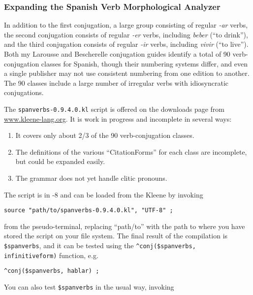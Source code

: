 \subsubsection{Expanding the Spanish Verb Morphological Analyzer}

In addition to the first conjugation, a large group consisting of regular
\mbox{\emph{-ar}} verbs, 
the second conjugation consists of regular \mbox{\emph{-er}} verbs, including \emph{beber} (``to drink''), and the third conjugation consists of
regular \mbox{\emph{-ir}} verbs, including \emph{vivir} (``to live'').  Both my Larousse and Bescherelle conjugation guides identify a total
of 90 verb-conjugation classes for Spanish, though their numbering systems differ, and even a
single publisher may not use consistent numbering from one edition to another.  The 90 classes
include a large number of irregular verbs with idiosyncratic conjugations.

The \verb!spanverbs-0.9.4.0.kl! script is offered on the downloads page from
\url{www.kleene-lang.org}.  It is work in progress and incomplete in several
ways:

\begin{enumerate}
	\item
It covers only about 2/3 of the 90 verb-conjugation classes.
\item
The definitions of the various ``CitationForms'' for each class are incomplete,
but could be expanded easily.
\item
The grammar does not yet handle clitic pronouns.
\end{enumerate}

\noindent
The script is in -8 and can be loaded from the Kleene \gui{} by
invoking


\begin{Verbatim}
source "path/to/spanverbs-0.9.4.0.kl", "UTF-8" ;
\end{Verbatim}

\noindent
from the pseudo-terminal, replacing ``path/to'' with the path to where
you have stored the script on your file system.  The final result of the compilation is
\verb!$spanverbs!, and it can be tested using the 
\verb!^conj($spanverbs, infinitiveform)! function, e.g.


\begin{Verbatim}
^conj($spanverbs, hablar) ;
\end{Verbatim}

You can also test \verb!$spanverbs! in the usual way, invoking


